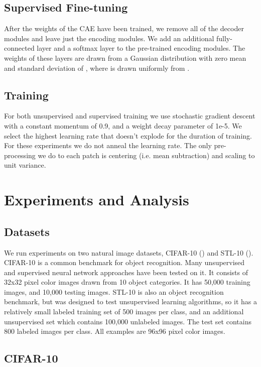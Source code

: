 \documentclass{article} \usepackage{iclr2015,times}
\begin{document}
\subsection{Supervised Fine-tuning}
After the weights of the CAE have been trained, we remove all of the decoder modules and leave just the encoding modules. We add an additional fully-connected layer and a softmax layer to the pre-trained encoding modules. The weights of these layers are drawn from a Gaussian distribution with zero mean and standard deviation of , where  is drawn uniformly from . 

\subsection{Training}
For both unsupervised and supervised training we use stochastic gradient descent with a constant  momentum of 0.9, and a weight decay parameter of 1e-5. We select the highest learning rate that doesn't explode for the duration of training. For these experiments we do not anneal the learning rate. The only pre-processing we do to each patch is centering (i.e. mean subtraction) and scaling to unit variance.
 
\section{Experiments and Analysis}
\label{sec:experiments}
\subsection{Datasets}
We run experiments on two natural image datasets, CIFAR-10 (\cite{krizhevsky2009learning}) and STL-10 (\cite{coates2011analysis}). CIFAR-10 is a common benchmark for object recognition. Many unsupervised and supervised neural network approaches have been tested on it. It consists of 32x32 pixel color images drawn from 10 object categories. It has 50,000 training images, and 10,000 testing images. STL-10 is also an object recognition benchmark, but was designed to test unsupervised learning algorithms, so it has a relatively small labeled training set of 500 images per class, and an additional unsupervised set which contains 100,000 unlabeled images. The test set contains 800 labeled images per class. All examples are 96x96 pixel color images.

\subsection{CIFAR-10}
\end{document}
